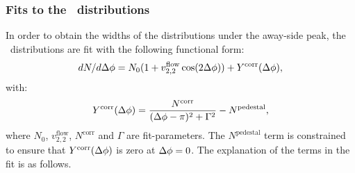 
\subsubsection{Fits to the \Dphi\ distributions}

In order to obtain the \iftoggle{IncludeYields}{yield and}{} widths of the distributions
  under the away-side peak, the \Dphi\ distributions are fit 
  with the following functional form:
\begin{eqnarray}
dN/d\mbox{$\Delta\phi$}=N_{0}(1+v^{\mathrm{flow}}_{2,2}\cos(2\mbox{$\Delta\phi$}))+ Y^{\mathrm{corr}}(\mbox{$\Delta\phi$}),
\label{eq:fit_func}
\end{eqnarray}
with:
\begin{eqnarray}
Y^{\mathrm{corr}} (\mbox{$\Delta\phi$}) = \frac{N^{\mathrm{corr}}}{(\mbox{$\Delta\phi$}-\pi)^2 + \Gamma^2}- N^{\mathrm{pedestal}},
\label{eq:signal_func}
\end{eqnarray}
where $N_0$, $v^{\mathrm{flow}}_{2,2}$, $N^{\mathrm{corr}}$ and $\Gamma$ are fit-parameters.
The $N^{\mathrm{pedestal}}$ term is constrained to ensure that 
  $Y^{\mathrm{corr}} (\mbox{$\Delta\phi$})$ is zero at $\mbox{$\Delta\phi$}=0$.
The explanation of the terms in the fit is as follows.

